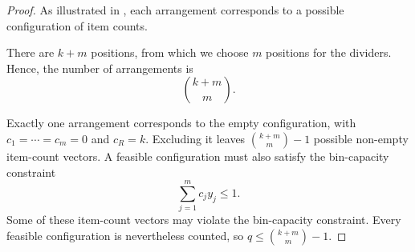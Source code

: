 \begin{proof}
As illustrated in ,
each arrangement corresponds to a possible
configuration of item counts.

There are $k+m$ positions, from which we
choose $m$ positions for the dividers.
Hence, the number of arrangements is
\[
    \binom{k+m}{m}.
\]

Exactly one arrangement corresponds to the empty
configuration, with $c_1=\cdots=c_m=0$ and $c_R=k$.
Excluding it leaves $\binom{k+m}{m}-1$ possible
non-empty item-count vectors. A feasible configuration
must also satisfy the bin-capacity constraint
\[
    \sum_{j=1}^{m}c_jy_j\leq1.
\]
Some of these item-count vectors may violate the
bin-capacity constraint. Every feasible configuration
is nevertheless counted, so
$q\leq\binom{k+m}{m}-1$.
\end{proof}
